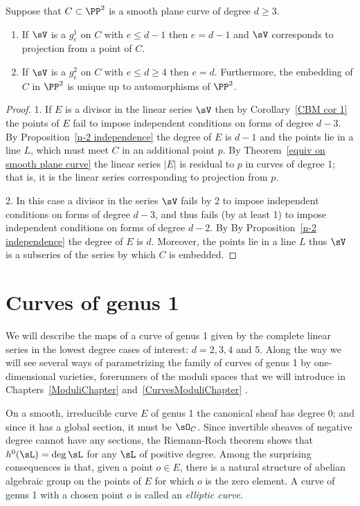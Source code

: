 \begin{corollary}\label{CBM cor 2}
 Suppose that $C\subset \PP^2$ is a smooth plane curve of degree $d\geq 3$.
 
\begin{enumerate}
 \item If $\sV$ is a $g^1_e$ on $C$ with $e\leq d-1$ then $e = d-1$ and $\sV$
 corresponds to projection from a point of $C$.
 \item If $\sV$ is a $g^2_e$ on $C$ with $e\leq d \geq 4$ then $e = d$. Furthermore,  the
  embedding of $C$ in $\PP^2$ is unique up to automorphisms of $\PP^2$.
 \end{enumerate}
\end{corollary}

\begin{proof}
 1. If $E$ is a divisor in the linear series $\sV$ then by Corollary~\ref{CBM cor 1} the points of $E$ fail to impose
 independent conditions on forms of degree $d-3$. By Proposition~\ref{n-2 independence} the degree of $E$ is $d-1$
 and the points lie in a line $L$, which must meet $C$ in an additional point $p$. By Theorem~\ref{equiv on smooth plane curve}
 the linear series $|E|$ is residual to $p$ in curves of degree 1; that is, it is the linear series corresponding to projection from $p$.
 
 2. In this case a divisor in the series $\sV$ fails by 2 to impose independent conditions on forms of degree $d-3$, and
 thus fails (by at least 1) to impose independent conditions on forms of degree $d-2$. By 
 By Proposition~\ref{n-2 independence} the degree of $E$ is $d$.
 Moreover, the points lie in a line $L$ thus $\sV$ is a subseries of the series by which $C$ is embedded.
 \end{proof}



\section{Curves of genus 1}

We will describe the maps of a curve of genus 1 given by
the complete linear series in the lowest degree cases of interest: $d =  2, 3, 4$ and $5$. Along the
way we will see several ways of parametrizing the family of curves of genus 1 by one-dimensional varieties,
forerunners of the moduli spaces that we will introduce in Chapters~\ref{ModuliChapter} and~\ref{CurvesModuliChapter} .


On a smooth, irreducible curve $E$ of genus 1 the canonical sheaf has degree 0; and since it has a global section, it must be $\sO_C$.
Since invertible sheaves of negative degree cannot have any sections, the Riemann-Roch theorem shows that
$h^0( \sL) = \deg \sL$ for any $\sL$ of positive degree. Among the surprising consequences is that, given
a point $o\in E$, there is a natural structure of abelian algebraic group on the points of $E$ for which $o$
is the zero element. A curve of genus 1 with a chosen point $o$ is called an \emph{elliptic curve}.

